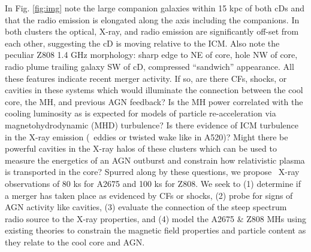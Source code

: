 \documentclass[letterpaper,11pt]{article}
\begin{document}
 In
Fig. \ref{fig:img} note the large companion galaxies within 15 kpc of
both cDs and that the radio emission is elongated along the axis
including the companions. In both clusters the optical, X-ray, and
radio emission are significantly off-set from each other, suggesting
the cD is moving relative to the ICM. Also note the peculiar Z808 1.4
GHz morphology: sharp edge to NE of core, hole NW of core, radio plume
trailing galaxy SW of cD, compressed ``sandwich'' appearance. All
these features indicate recent merger activity. If so, are there CFs,
shocks, or cavities in these systems which would illuminate the
connection between the cool core, the MH, and previous AGN feedback?
Is the MH power correlated with the cooling luminosity as is expected
for models of particle re-acceleration via magnetohydrodynamic (MHD)
turbulence? Is there evidence of ICM turbulence in the X-ray emission
(\eg\ eddies or twisted wake like in A520)? Might there be powerful
cavities in the X-ray halos of these clusters which can be used to
measure the energetics of an AGN outburst and constrain how
relativistic plasma is transported in the core? Spurred along by these
questions, we propose \chandra\ X-ray observations of 80 ks for A2675
and 100 ks for Z808. We seek to (1) determine if a merger has taken
place as evidenced by CFs or shocks, (2) probe for signs of AGN
activity like cavities, (3) evaluate the connection of the steep
spectrum radio source to the X-ray properties, and (4) model the A2675
\& Z808 MHs using existing theories to constrain the magnetic field
properties and particle content as they relate to the cool core and
AGN. \vspace{5.5pt}
\end{document}
